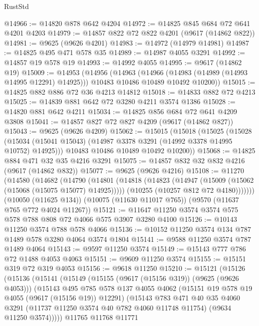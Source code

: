 \begin{lexlean}{RustStd}
\begin{coremodule}
{\begin{coremodule}
{{{{{{{{{{{{{{{{{{{{{{{{{{{{{{{{{@14966 := @14820 @878 @642 @4204
@14972 := @14825 @845 @684 @72 @641 @4201 @4203
@14979 := @14857 @822 @72 @822 @4201 (@9617 (@14862 @822))
@14981 := @9625 (@9626 @4201)
@14983 := @14972 (@14979 @14981)
@14987 := @14825 @495 @471 @578 @35
@14989 := @14987 @4055 @3291
@14992 := @14857 @19 @578 @19
@14993 := @14992 @4055
@14995 := @9617 (@14862 @19)
@15009 := @14953
    (@14956
      (@14963
        (@14966 (@14983 (@14989 (@14993 @14995 @12291) @14925)))
        @10483
        @10486
        @10489
        @10492
        @10200))
@15015 := @14825 @882 @886 @72 @36 @4213 @14812
@15018 := @14833 @882 @72 @4213
@15025 := @14839 @881 @642 @72 @3280 @4211 @3574 @1386
@15028 := @14820 @881 @642 @4211
@15034 := @14825 @856 @684 @72 @641 @4209 @3808
@15041 := @14857 @827 @72 @827 @4209 (@9617 (@14862 @827))
@15043 := @9625 (@9626 @4209)
@15062 := @15015
    (@15018
      (@15025
        (@15028 (@15034 (@15041 @15043) (@14987 @3378 @3291 (@14992 @3378 @14995 @10752) @14925)))
        @10483
        @10486
        @10489
        @10492
        @10200))
@15068 := @14825 @884 @471 @32 @35 @4216 @3291
@15075 := @14857 @832 @32 @832 @4216 (@9617 (@14862 @832))
@15077 := @9625 (@9626 @4216)
@15108 := @11270
    (@14580
      (@14682
        (@14790
          (@14801
            (@14818
              (@14823 (@14947 (@15009 (@15062 (@15068 (@15075 @15077) @14925)))))
              (@10255 (@10257 @812 @72 @4180)))))))
    (@10050 (@11625 @134))
    (@10075 (@11630 @11017 @765))
    (@9570 (@11637 @765 @772 @4024 @11267))
@15121 := @11647 @11250 @3574 @3574 @575 @578 @788 @808 @72 @4066 @575 @3907 @3280 @4100
@15126 := @10143 @11250 @3574 @788 @578 @4066
@15136 := @10152 @11250 @3574 @134 @787 @1489 @578 @3280 @4064 @3574 @1804
@15141 := @9588 @11250 @3574 @787 @1489 @4064
@15143 := @9597 @11250 @3574
@15149 := @15143 @777 @786 @72 @1488 @4053 @4063
@15151 := @9609 @11250 @3574
@15155 := @15151 @319 @72 @319 @4053
@15156 := @9618 @11250
@15210 := @15121
    (@15126
      (@15136
        (@15141
          (@15149
            (@15155 (@9617 (@15156 @319)) (@9625 (@9626 @4053)))
            (@15143
              @495
              @785
              @578
              @137
              @4055
              @4062
              (@15151 @19 @578 @19 @4055 (@9617 (@15156 @19)) @12291)
              (@15143
                @783
                @471
                @40
                @35
                @4060
                @3291
                (@11737 @11250 @3574 @40 @782 @4060 @11748 @11754)
                (@9634 @11250 @3574)))))
        @11765
        @11768
        @11771
}}}}}}}}}}}}}}}}}}}}}}}}}}}}}}}}}
\end{coremodule}}
\end{coremodule}
\end{lexlean}
